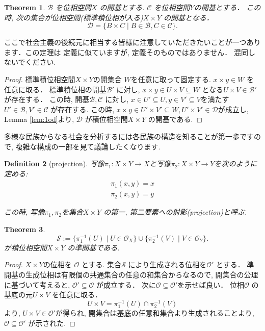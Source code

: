 \documentclass[lualatex]{ltjsbook}
\newtheorem{theorem}{Theorem}[chapter]
\newtheorem{definition}[theorem]{Definition}
\theoremstyle{remark}
\theoremstyle{plain}
\begin{document}
\begin{theorem}
$\mathcal{B}$ を位相空間$X$ の開基とする.
$\mathcal{C}$ を位相空間$Y$の開基とする．
この時,  次の集合が位相空間(標準積位相が入る)$X \times Y$ の開基となる．
\[
\mathcal{D}= \{B \times C  \mid B \in \mathcal{B} ,  C \in \mathcal{C} \}
.\] 
\end{theorem}

ここで社会主義の後続元に相当する皆様に注意していただきたいことが一つあります．この定理は
定義に似ていますが,  定義そのものではありません． 混同しないでください.
\begin{proof}
	標準積位相空間$X \times Y$の開集合 $W$を任意に取って固定する. 
	$x\times y \in W$ を任意に取る．
	標準積位相の開基$\mathcal{B'}$ に対し,  $x \times y \in U \times V \subseteq W$ となる$U \times V \in \mathcal{B'}$ が存在する．
	この時,  開基$\mathcal{B}, \mathcal{C}$ に対し,  $x \in U' \subseteq U,  y \in V' \subseteq V$を満たす $U' \in \mathcal{B}, V' \in \mathcal{C}$ が存在する.
	この時,  $x\times y \in U' \times V' \subseteq W, U' \times V' \in \mathcal{D}$が成立し,  Lemma \ref{lem:1od}より,  $\mathcal{D}$ が積位相空間$X\times Y$ の開基である.
\end{proof}

多様な民族からなる社会を分析するには各民族の構造を知ることが第一歩ですので,  複雑な構成の一部を見て議論したくなります.

\begin{definition}[projection]
	写像$\pi_1 : X \times Y \to X$と写像$\pi_2 : X \times Y \to Y$を次のように定める:
	\[
	\begin{aligned}
		\pi_1(x, y) =x \\
		\pi_2(x, y)=y
	\end{aligned}
	\] 

	この時,  写像$\pi_1, \pi_2$を集合$X \times Y$ の第一,  第二要素への射影(projection)と呼ぶ.
\end{definition}

\begin{theorem}
	\[
	\mathcal{S}:= \{\pi_1^{-1} \left( U \right)  \mid U \in \mathcal{O}_X		\} \cup \{ \pi_2^{-1} \left( V \right)   \mid  V \in \mathcal{O}_Y\} 
	.\] 
	が積位相空間$X \times Y$ の準開基である.
\end{theorem}

\begin{proof}
	$X\times Y$の位相を $\mathcal{O}$ とする.
	集合$\mathcal{S}$ により生成される位相を$\mathcal{O}'$ とする．
	準開基の生成位相は有限個の共通集合の任意の和集合からなるので,  開集合の公理に基づいて考えると,  $\mathcal{O}' \subseteq \mathcal{O}$ が成立する．
	次に$\mathcal{O} \subseteq \mathcal{O}'$を示せば良い．
	位相$\mathcal{O}$ の基底の元$U\times V $ を任意に取る．
	$$
	U \times V = \pi_1^{-1}\left( U \right) \cap \pi_2^{-1}\left( V \right)  
	$$
	より,  $U \times V \in \mathcal{O}'$が得られ,  開集合は基底の任意和集合より生成されることより,  $\mathcal{O} \subseteq \mathcal{O}'$ が示された.
\end{proof}
\end{document}
